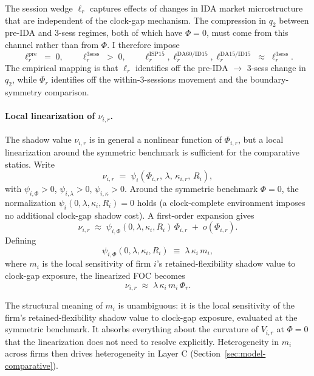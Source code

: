 \documentclass[11pt]{article}
\begin{document}
The session wedge $\ell_{r}$ captures effects of changes in IDA market microstructure that are independent of the clock-gap mechanism. The compression in $q_{2}$ between pre-IDA and 3-sess regimes, both of which have $\Phi = 0$, must come from this channel rather than from $\Phi$. I therefore impose
\[
\ell^{\text{pre}}_{r} \;=\; 0, \qquad \ell^{\text{3sess}}_{r} \;>\; 0, \qquad \ell^{\text{ISP15}}_{r}, \ell^{\text{DA60/ID15}}_{r}, \ell^{\text{DA15/ID15}}_{r} \;\approx\; \ell^{\text{3sess}}_{r}.
\]
The empirical mapping is that $\ell_{r}$ identifies off the pre-IDA $\to$ 3-sess change in $q_{2}$, while $\Phi_{r}$ identifies off the within-3-sessions movement and the boundary-symmetry comparison.

\paragraph{Local linearization of $\nu_{i,r}$.} The shadow value $\nu_{i,r}$ is in general a nonlinear function of $\Phi_{i,r}$, but a local linearization around the symmetric benchmark is sufficient for the comparative statics. Write
\begin{equation}
\nu_{i,r} \;=\; \psi_{i}(\Phi_{i,r},\,\lambda,\,\kappa_{i,r},\,R_{i}),
\end{equation}
with $\psi_{i,\Phi} > 0$, $\psi_{i,\lambda} > 0$, $\psi_{i,\kappa} > 0$. Around the symmetric benchmark $\Phi = 0$, the normalization $\psi_{i}(0,\lambda,\kappa_{i},R_{i}) = 0$ holds (a clock-complete environment imposes no additional clock-gap shadow cost). A first-order expansion gives
\begin{equation}
\nu_{i,r} \;\approx\; \psi_{i,\Phi}(0,\lambda,\kappa_{i},R_{i})\,\Phi_{i,r} \;+\; o(\Phi_{i,r}).
\end{equation}
Defining
\begin{equation}
\psi_{i,\Phi}(0,\lambda,\kappa_{i},R_{i}) \;\equiv\; \lambda\,\kappa_{i}\,m_{i},
\label{eq:msens}
\end{equation}
where $m_{i}$ is the local sensitivity of firm $i$'s retained-flexibility shadow value to clock-gap exposure, the linearized FOC becomes
\begin{equation}
\boxed{\;\;
\nu_{i,r} \;\approx\; \lambda\,\kappa_{i}\,m_{i}\,\Phi_{r}.
\;\;}
\label{eq:nulinear}
\end{equation}

The structural meaning of $m_{i}$ is unambiguous: it is the local sensitivity of the firm's retained-flexibility shadow value to clock-gap exposure, evaluated at the symmetric benchmark. It absorbs everything about the curvature of $V_{i,r}$ at $\Phi = 0$ that the linearization does not need to resolve explicitly. Heterogeneity in $m_{i}$ across firms then drives heterogeneity in Layer C (Section~\ref{sec:model-comparative}).
\end{document}
